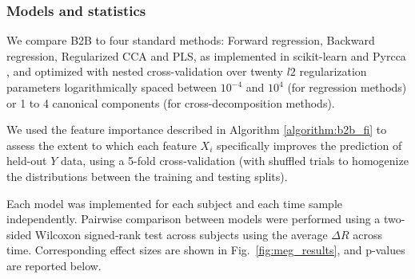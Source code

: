 \subsubsection{Models and statistics}

We compare B2B to four standard methods: Forward regression, Backward
regression, Regularized CCA and PLS, as implemented in scikit-learn
\citep{sklearn} and Pyrcca \citep{bilenko2016Pyrcca}, and optimized with nested cross-validation over twenty $l2$
regularization parameters logarithmically spaced between $10^{-4}$ and $10^4$
(for regression methods) or 1 to 4 canonical components (for cross-decomposition
methods).

We used the feature importance described in Algorithm \ref{algorithm:b2b_fi} to assess the extent to which each feature $X_i$ specifically improves the prediction of held-out $Y$ data, using a 5-fold cross-validation (with shuffled trials to homogenize the distributions between the training and testing splits).

Each model was implemented for each subject and each time sample independently.
Pairwise comparison between models were performed using a two-sided Wilcoxon
signed-rank test across subjects using the average $\Delta R$ across time.
Corresponding effect sizes are shown in Fig.~\ref{fig:meg_results}, and
p-values are reported below.



